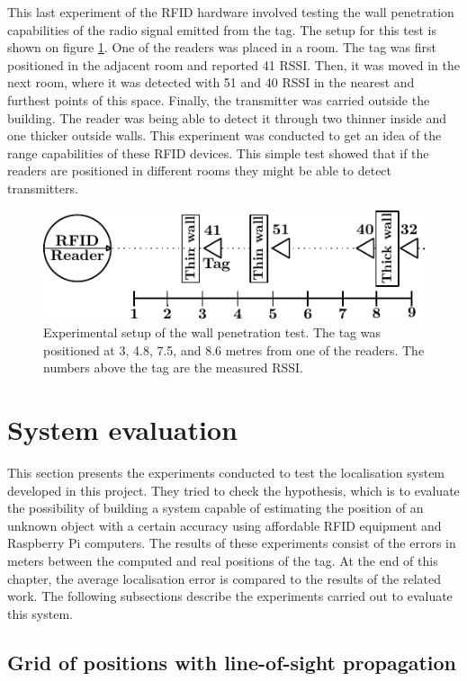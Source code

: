 This last experiment of the RFID hardware involved testing the wall penetration capabilities of the radio signal emitted from the tag. The setup for this test is shown on figure \ref{fig:pene}. One of the readers was placed in a room. The tag was first positioned in the adjacent room and reported 41 RSSI. Then, it was moved in the next room, where it was detected with 51 and 40 RSSI in the nearest and furthest points of this space. Finally, the transmitter was carried outside the building. The reader was being able to detect it through two thinner inside and one thicker outside walls. This experiment was conducted to get an idea of the range capabilities of these RFID devices. This simple test showed that if the readers are positioned in different rooms they might be able to detect transmitters. 
\begin{figure}[h]
	\begin{center}
		\includegraphics[width=.6\textwidth]{figures/exp/penetration}
		\caption{Experimental setup of the wall penetration test. The tag was positioned at 3, 4.8, 7.5, and 8.6 metres from one of the readers. The numbers above the tag are the measured RSSI.}
		\label{fig:pene}
	\end{center}
\end{figure}


\section{System evaluation}
\label{sec:syseval}

This section presents the experiments conducted to test the localisation system developed in this project. They tried to check the hypothesis, which is to evaluate the possibility of building a system capable of estimating the position of an unknown object with a certain accuracy using affordable RFID equipment and Raspberry Pi computers. The results of these experiments consist of the errors in meters between the computed and real positions of the tag. At the end of this chapter, the average localisation error is compared to the results of the related work. The following subsections describe the experiments carried out to evaluate this system.


\subsection{Grid of positions with line-of-sight propagation}

